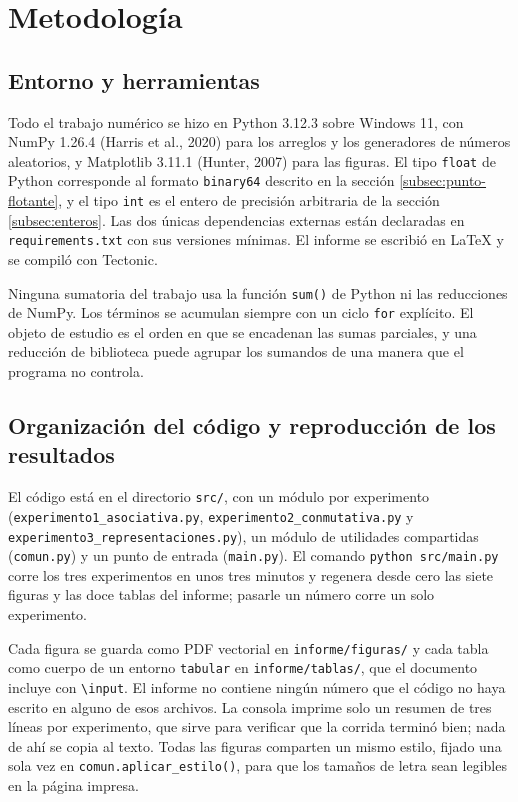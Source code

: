 \section{Metodología}
\label{sec:metodologia}

\subsection{Entorno y herramientas}
\label{subsec:entorno}

Todo el trabajo numérico se hizo en Python 3.12.3 sobre Windows 11, con NumPy 1.26.4 (Harris
et al., 2020) para los arreglos y los generadores de números aleatorios, y Matplotlib 3.11.1
(Hunter, 2007) para las figuras. El tipo \texttt{float} de Python corresponde al formato
\texttt{binary64} descrito en la sección \ref{subsec:punto-flotante}, y el tipo \texttt{int} es el
entero de precisión arbitraria de la sección \ref{subsec:enteros}. Las dos únicas dependencias
externas están declaradas en \texttt{requirements.txt} con sus versiones mínimas. El informe se
escribió en \LaTeX{} y se compiló con Tectonic.

Ninguna sumatoria del trabajo usa la función \texttt{sum()} de Python ni las reducciones de NumPy.
Los términos se acumulan siempre con un ciclo \texttt{for} explícito.
El objeto de estudio es el orden en que se encadenan las sumas parciales, y una reducción de
biblioteca puede agrupar los sumandos de una manera que el programa no controla.

\subsection{Organización del código y reproducción de los resultados}
\label{subsec:codigo}

El código está en el directorio \texttt{src/}, con un módulo por experimento
(\texttt{experimento1\_\allowbreak asociativa.py},
\texttt{experimento2\_\allowbreak conmutativa.py} y
\texttt{experimento3\_\allowbreak representaciones.py}), un módulo de utilidades compartidas
(\texttt{comun.py}) y un punto de entrada (\texttt{main.py}). El comando \texttt{python src/main.py}
corre los tres experimentos en unos tres minutos y regenera desde cero las siete figuras y las doce
tablas del informe; pasarle un número corre un solo experimento.

Cada figura se guarda como PDF vectorial en \texttt{informe/figuras/} y cada tabla como cuerpo de
un entorno \texttt{tabular} en \texttt{informe/tablas/}, que el documento incluye con
\texttt{\textbackslash input}. El informe no contiene ningún número que el código no haya escrito
en alguno de esos archivos. La consola imprime solo un resumen de tres líneas por experimento, que
sirve para verificar que la corrida terminó bien; nada de ahí se copia al texto. Todas las figuras
comparten un mismo estilo, fijado una sola vez en \texttt{comun.aplicar\_estilo()}, para que los
tamaños de letra sean legibles en la página impresa.

